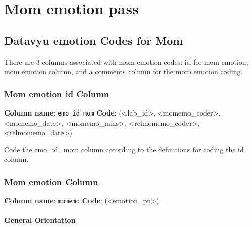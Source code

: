 \documentclass[
]{book}
\begin{document}
\hypertarget{mom-emotion-pass}{%
\section{Mom emotion pass}\label{mom-emotion-pass}}

\hypertarget{datavyu-emotion-codes-for-mom}{%
\subsection{Datavyu emotion Codes for Mom}\label{datavyu-emotion-codes-for-mom}}

There are 3 columns associated with mom emotion codes: id for mom emotion, mom emotion column, and a comments column for the mom emotion coding.

\hypertarget{mom-emotion-id-column}{%
\subsubsection*{Mom emotion id Column}\label{mom-emotion-id-column}}

\textbf{Column name}: \texttt{emo\_id\_mom}
\textbf{Code}: (\textless lab\_id\textgreater, \textless momemo\_coder\textgreater, \textless momemo\_date\textgreater, \textless momemo\_mins\textgreater, \textless relmomemo\_coder\textgreater, \textless relmomemo\_date\textgreater)

Code the emo\_id\_mom column according to the definitions for coding the id column.

\hypertarget{mom-emotion-column}{%
\subsubsection*{Mom emotion Column}\label{mom-emotion-column}}

\textbf{Column name}: \texttt{momemo}
\textbf{Code}: (\textless emotion\_pn\textgreater)

\hypertarget{general-orientation-1}{%
\paragraph*{General Orientation}\label{general-orientation-1}}
\end{document}
